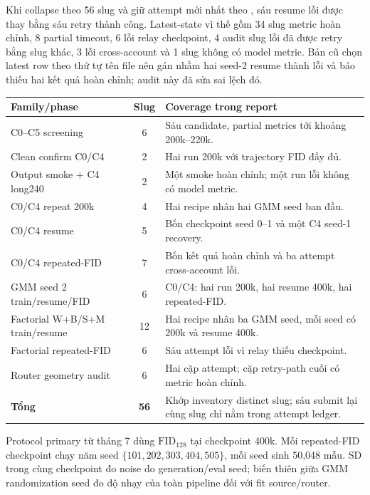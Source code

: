 \documentclass[11pt,a4paper]{article}
\newcommand{\fid}{\mathrm{FID}}
\newcommand{\metric}[1]{\texttt{\small\detokenize{#1}}}
\begin{document}
Khi collapse theo 56 slug và giữ attempt mới nhất theo \metric{generated_at_utc}, sáu resume lỗi được thay bằng sáu retry thành công. Latest-state vì thế gồm 34 slug metric hoàn chỉnh, 8 partial timeout, 6 lỗi relay checkpoint, 4 audit slug lỗi đã được retry bằng slug khác, 3 lỗi cross-account và 1 slug không có model metric. Bản cũ chọn latest row theo thứ tự tên file nên gán nhầm hai seed-2 resume thành lỗi và báo thiếu hai kết quả hoàn chỉnh; audit này đã sửa sai lệch đó.

\begin{center}
\small
\setlength{\tabcolsep}{3.5pt}
\begin{tabularx}{\linewidth}{@{}Y c Y@{}}
\toprule
\textbf{Family/phase} & \textbf{Slug} & \textbf{Coverage trong report}\\
\midrule
C0--C5 screening & 6 & Sáu candidate, partial metrics tới khoảng 200k--220k.\\
Clean confirm C0/C4 & 2 & Hai run 200k với trajectory FID đầy đủ.\\
Output smoke + C4 long240 & 2 & Một smoke hoàn chỉnh; một run lỗi không có model metric.\\
C0/C4 repeat 200k & 4 & Hai recipe nhân hai GMM seed ban đầu.\\
C0/C4 resume & 5 & Bốn checkpoint seed 0--1 và một C4 seed-1 recovery.\\
C0/C4 repeated-FID & 7 & Bốn kết quả hoàn chỉnh và ba attempt cross-account lỗi.\\
GMM seed 2 train/resume/FID & 6 & C0/C4: hai run 200k, hai resume 400k, hai repeated-FID.\\
Factorial W+B/S+M train/resume & 12 & Hai recipe nhân ba GMM seed, mỗi seed có 200k và resume 400k.\\
Factorial repeated-FID & 6 & Sáu attempt lỗi vì relay thiếu checkpoint.\\
Router geometry audit & 6 & Hai cặp attempt; cặp retry-path cuối có metric hoàn chỉnh.\\
\midrule
\textbf{Tổng} & \textbf{56} & Khớp inventory distinct slug; sáu submit lại cùng slug chỉ nằm trong attempt ledger.\\
\bottomrule
\end{tabularx}
\end{center}

Protocol primary từ tháng 7 dùng \(\fid_{128}\) tại checkpoint 400k. Mỗi repeated-FID checkpoint chạy năm seed \(\{101,202,303,404,505\}\), mỗi seed sinh 50,048 mẫu. SD trong cùng checkpoint đo noise do generation/eval seed; biến thiên giữa GMM randomization seed đo độ nhạy của toàn pipeline đối với fit source/router.
\end{document}
